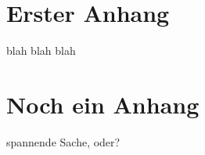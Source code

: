 \begin{appendix}


    \section{Erster Anhang}
    blah blah blah
    
    \section{Noch ein Anhang}
    spannende Sache, oder?
    
    
\end{appendix}


